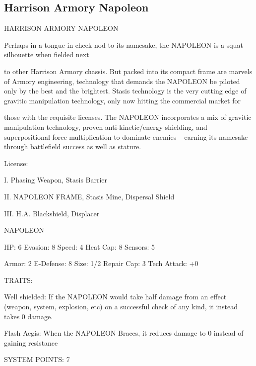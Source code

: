                                                                                                                 


\subsection{Harrison Armory Napoleon}


                             HARRISON ARMORY NAPOLEON  

Perhaps in a tongue-in-cheek nod to its namesake, the NAPOLEON is a squat silhouette when fielded next  

to other Harrison Armory chassis. But packed into its compact frame are marvels of Armory engineering,  
technology that demands the NAPOLEON be piloted only by the best and the brightest. Stasis technology  
is the very cutting edge of gravitic manipulation technology, only now hitting the commercial market for  

those with the requisite licenses. The NAPOLEON incorporates a mix of gravitic manipulation technology,  
proven anti-kinetic/energy shielding, and superpositional force multiplication to dominate enemies --  
earning its namesake through battlefield success as well as stature.    

                                                  License:
 
I. Phasing Weapon, Stasis Barrier
 
II. NAPOLEON FRAME, Stasis Mine, Dispersal Shield
 
III. H.A. Blackshield, Displacer
 

                                               NAPOLEON 

 HP: 6          Evasion: 8                           Speed: 4           Heat Cap: 8       Sensors:  5 

 Armor: 2       E-Defense: 8                         Size: 1/2          Repair Cap: 3     Tech Attack:  
                                                                                          +0 

                                                  TRAITS: 

 Well shielded: If the NAPOLEON would take half damage from an effect (weapon, system, explosion,  
 etc) on a successful check of any kind, it instead takes 0 damage.
 
 Flash Aegis: When the NAPOLEON Braces, it reduces damage to 0 instead of gaining resistance 

                                            SYSTEM POINTS: 7 

